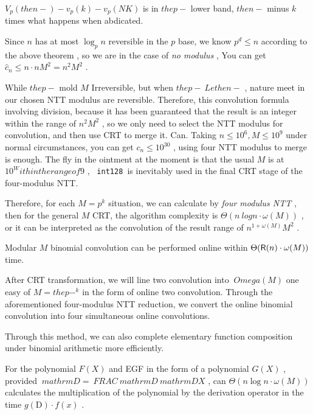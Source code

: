 \begin { theorem }[Kummer]

$ V_p (the n-) -v_p (k) -v_p (NK) $ is in $ the p- $ lower band, $ the n- $ minus $ k $ times what happens when abdicated.

\end { theorem }

Since $ n $ has at most $ \log _p n $ reversible in the $ p $ base, we know $ p^d \le n $ according to the above theorem , so we are in the case of \emph { no modulus } , You can get $ \widehat c_n \le n \cdot nM^ 2 = n^ 2 M^ 2 $ .

While $ the p- $ mold $ M $ Irreversible, but when $ the p- \ Le the n- $ , nature meet in our chosen NTT modulus are reversible. Therefore, this convolution formula involving division, because it has been guaranteed that the result is an integer within the range of $ n^ 2 M^ 2 $ , so we only need to select the NTT modulus for convolution, and then use CRT to merge it. Can. Taking $ n \le  10 ^ 6 , M \le  10 ^ 9 $ under normal circumstances, you can get $ c_n \le  10 ^{30} $ , using four NTT modulus to merge is enough. The fly in the ointment at the moment is that the usual $ M $ is at $ 10 ^Within the range of 9 $ , \texttt { int128 }is inevitably used in the final CRT stage of the four-modulus NTT.

Therefore, for each $ M=p^k $ situation, we can calculate by \emph { four modulus NTT }, then for the general $ M $ CRT, the algorithm complexity is $ \Theta (n \ log n \cdot  \omega (M)) $ , or it can be interpreted as the convolution of the result range of $ n^{1+ \omega (M)}M^ 2 $ .

\begin { theorem }
Modular $ M $ binomial convolution can be performed online within $ \Theta (  \mathsf R (n) \cdot  \omega (M)) $ time.
\end { theorem }

After CRT transformation, we will line two convolution into $ \ Omega (M) $ one easy of $ M = the p-^ k $ in the form of online two convolution. Through the aforementioned four-modulus NTT reduction, we convert the online binomial convolution into four simultaneous online convolutions.

Through this method, we can also complete elementary function composition under binomial arithmetic more efficiently.

\begin { theorem }
For the polynomial $ F (X) $ and EGF in the form of a polynomial $ G (X) $ , provided $ \ mathrm {D} = \ FRAC { \ mathrm {D}} { \ mathrm {D} X} $ , can $ \Theta (n \log n \cdot  \omega (M)) $ calculates the multiplication of the polynomial by the derivation operator in the time $ g( \mathrm {D}) \cdot f(x) $ .
\end { theorem }

